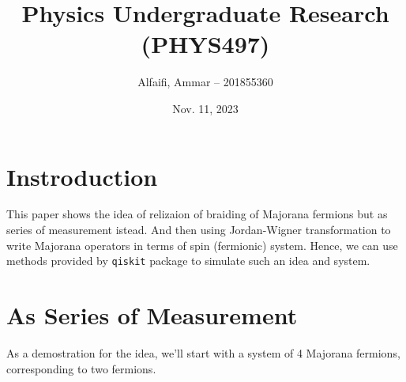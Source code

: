 \documentclass{paper}
\title{Physics Undergraduate Research (PHYS497)}
\author{Alfaifi, Ammar -- 201855360}
\date{Nov. 11, 2023}
\def\c#1{\texttt{#1}}
\begin{document}
\maketitle

\section{Instroduction} %
\label{sec:Instroduction}
This paper shows the idea of relizaion of braiding of Majorana fermions but as 
series of measurement istead. And then using Jordan-Wigner transformation to 
write Majorana operators in terms of spin (fermionic) system. Hence, we can use 
methods provided by \c{qiskit} package to simulate such an idea and system.

\section{As Series of Measurement} %
\label{sec:As Series of measurement}
As a demostration for the idea, we'll start with a system of 4 Majorana fermions, 
corresponding to two fermions. 
\end{document}
